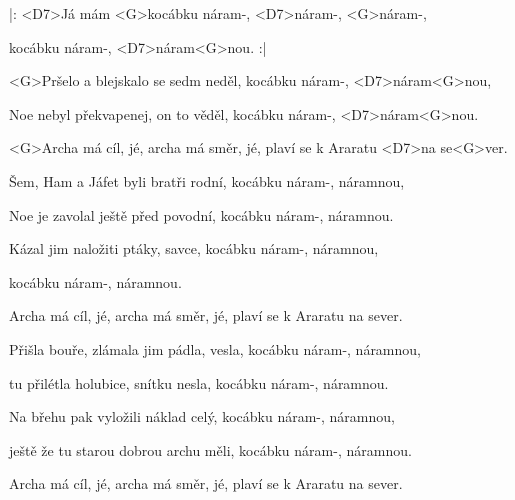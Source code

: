 

\zr
|: <D7>Já mám <G>kocábku náram-, <D7>náram-, <G>náram-,

kocábku náram-, <D7>náram<G>nou. :|
\kr

\zs
<G>Pršelo a blejskalo se sedm neděl,
kocábku náram-, <D7>náram<G>nou,

Noe nebyl překvapenej, on to věděl,
kocábku náram-, <D7>náram<G>nou.
\ks

\zr \kr

\zr
<G>Archa má cíl, jé, archa má směr, jé,
plaví se k Araratu <D7>na se<G>ver.
\kr

\zr \kr

\zs
Šem, Ham a Jáfet byli bratři rodní,
kocábku náram-, náramnou,

Noe je zavolal ještě před povodní,
kocábku náram-, náramnou.
\ks

\zs
Kázal jim naložiti ptáky, savce,
kocábku náram-, náramnou,

kocábku náram-, náramnou.
\ks

\zr \kr

\zr
Archa má cíl, jé, archa má směr, jé,
plaví se k Araratu na sever.
\kr

\zr \kr

\zs
Přišla bouře, zlámala jim pádla, vesla,
kocábku náram-, náramnou,

tu přilétla holubice, snítku nesla,
kocábku náram-, náramnou.
\ks

\zs
Na břehu pak vyložili náklad celý,
kocábku náram-, náramnou,

ještě že tu starou dobrou archu měli,
kocábku náram-, náramnou.
\ks

\zr \kr

\zr
Archa má cíl, jé, archa má směr, jé,
plaví se k Araratu na sever.
\kr

\zr \kr

\kp
